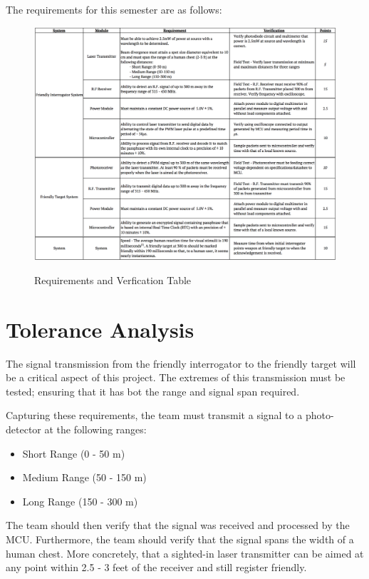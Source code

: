 \documentclass[openbib,letterpaper,10pt]{article}
\begin{document}
\begin{spacing}{1.15}
The requirements for this semester are as follows: 
\begin{figure} [H]
	\centering
	\includegraphics[scale=0.45]{Requirements-Verification-Table.png}
	\label{fig:brequirements-table}
	\caption{Requirements and Verfication Table}
\end{figure}

\section{Tolerance Analysis}
The signal transmission from the friendly interrogator to the friendly target will be a critical aspect of this project. The extremes of this transmission must be tested; ensuring that it has bot the range and signal span required. 

Capturing these requirements, the team must transmit a signal to a photo-detector at the following ranges:
		\begin{itemize}
			\item Short Range (0 - 50 m)
			\item Medium Range (50 - 150 m)
			\item Long Range (150 - 300 m)
		\end{itemize}

The team should then verify that the signal was received and processed by the MCU. Furthermore, the team should verify that the signal spans the width of a human chest. More concretely, that a sighted-in laser transmitter can be aimed at any point within 2.5 - 3 feet of the receiver and still register friendly. 


\end{spacing}
\end{document}

